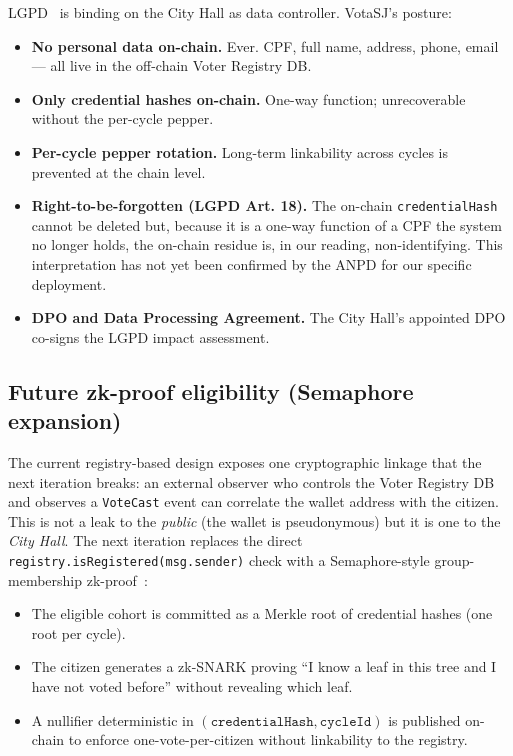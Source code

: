 \documentclass[12pt]{article}
\begin{document}
LGPD~\cite{lgpd} is binding on the City Hall as data controller. VotaSJ's
posture:

\begin{itemize}
  \item \textbf{No personal data on-chain.} Ever. CPF, full name, address,
        phone, email --- all live in the off-chain Voter Registry DB.
  \item \textbf{Only credential hashes on-chain.} One-way function;
        unrecoverable without the per-cycle pepper.
  \item \textbf{Per-cycle pepper rotation.} Long-term linkability across
        cycles is prevented at the chain level.
  \item \textbf{Right-to-be-forgotten (LGPD Art. 18).} The on-chain
        \texttt{credentialHash} cannot be deleted but, because it is a
        one-way function of a CPF the system no longer holds, the on-chain
        residue is, in our reading, non-identifying. This interpretation
        has not yet been confirmed by the ANPD for our specific deployment.
  \item \textbf{DPO and Data Processing Agreement.} The City Hall's appointed
        DPO co-signs the LGPD impact assessment.
\end{itemize}

\subsection{Future zk-proof eligibility (Semaphore expansion)}
\label{sec:zk}

The current registry-based design exposes one cryptographic linkage that
the next iteration breaks: an external observer who controls the Voter
Registry DB and observes a \texttt{VoteCast} event can correlate the wallet
address with the citizen. This is not a leak to the \emph{public} (the
wallet is pseudonymous) but it is one to the \emph{City Hall}. The next
iteration replaces the direct \texttt{registry.isRegistered(msg.sender)}
check with a Semaphore-style group-membership
zk-proof~\cite{semaphoredocs,semaphoregithub}:

\begin{itemize}
  \item The eligible cohort is committed as a Merkle root of credential
        hashes (one root per cycle).
  \item The citizen generates a zk-SNARK proving ``I know a leaf in this
        tree and I have not voted before'' without revealing which leaf.
  \item A nullifier deterministic in \((\texttt{credentialHash},
        \texttt{cycleId})\) is published on-chain to enforce
        one-vote-per-citizen without linkability to the registry.
\end{itemize}
\end{document}
